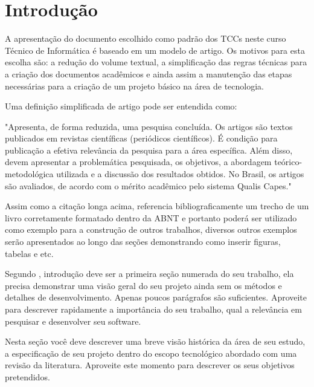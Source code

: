 \documentclass[a4paper,12pt]{article}
\begin{document}
\section{Introdução}

A apresentação do documento escolhido como padrão dos TCCs neste curso Técnico de Informática é baseado em um modelo de artigo. Os motivos para esta escolha são: a redução do volume textual, a simplificação das regras técnicas para a criação dos documentos acadêmicos e ainda assim a manutenção das etapas necessárias para a criação de um projeto básico na área de tecnologia.

Uma definição simplificada de artigo pode ser entendida como:

\begin{citacaolonga}
"Apresenta, de forma reduzida, uma pesquisa concluída. Os artigos são textos publicados em revistas científicas (periódicos científicos). É condição para publicação a efetiva relevância da pesquisa para a área específica. Além disso, devem apresentar a problemática pesquisada, os objetivos, a abordagem teórico-metodológica utilizada e a discussão dos resultados obtidos. No Brasil, os artigos são avaliados, de acordo com o mérito acadêmico pelo sistema Qualis Capes." \citep{petermann2020escrita}
\end{citacaolonga}

Assim como a citação longa acima, referencia bibliograficamente um trecho de um livro corretamente formatado dentro da ABNT e portanto poderá ser utilizado como exemplo para a construção de outros trabalhos, diversos outros exemplos serão apresentados ao longo das seções demonstrando como inserir figuras, tabelas e etc.

Segundo \citet{botelho2021praticas}, introdução deve ser a primeira seção numerada do seu trabalho, ela precisa demonstrar uma visão geral do seu projeto ainda sem os métodos e detalhes de desenvolvimento. Apenas poucos parágrafos são suficientes. Aproveite para descrever rapidamente a importância do seu trabalho, qual a relevância em pesquisar e desenvolver seu software.

Nesta seção você deve descrever uma breve visão histórica da área de seu estudo, a especificação de seu projeto dentro do escopo tecnológico abordado com uma revisão da literatura. Aproveite este momento para descrever os seus objetivos pretendidos.

\end{document}
